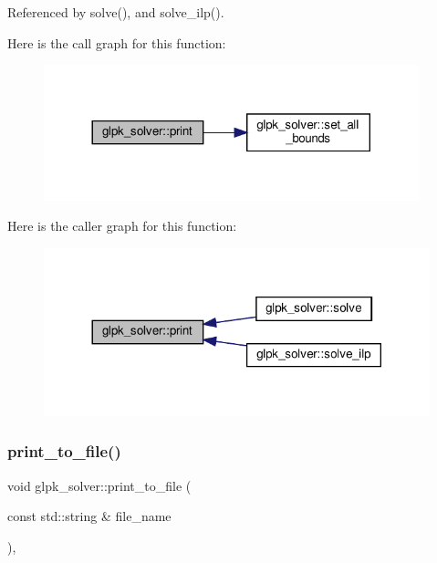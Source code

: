 Referenced by solve(), and solve\+\_\+ilp().

Here is the call graph for this function\+:
\nopagebreak
\begin{figure}[H]
\begin{center}
\leavevmode
\includegraphics[width=308pt]{db/d0a/classglpk__solver_a0a3f1dcdb065e42d04a45a6cd6864b90_cgraph}
\end{center}
\end{figure}
Here is the caller graph for this function\+:
\nopagebreak
\begin{figure}[H]
\begin{center}
\leavevmode
\includegraphics[width=317pt]{db/d0a/classglpk__solver_a0a3f1dcdb065e42d04a45a6cd6864b90_icgraph}
\end{center}
\end{figure}
\mbox{\label{classglpk__solver_aaee0e321445ea081d26952772e4e2eef}} 
\subsubsection{\texorpdfstring{print\+\_\+to\+\_\+file()}{print\_to\_file()}}
{\footnotesize\ttfamily void glpk\+\_\+solver\+::print\+\_\+to\+\_\+file (\begin{DoxyParamCaption}\item[{const std\+::string \&}]{file\+\_\+name }\end{DoxyParamCaption})\hspace{0.3cm}{\ttfamily [override]}, {\ttfamily [virtual]}}




